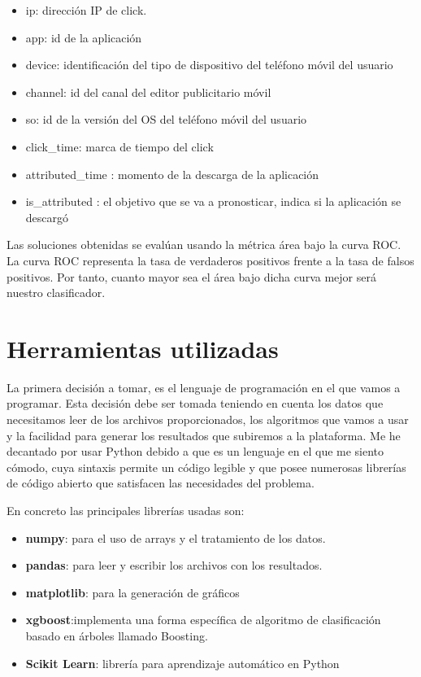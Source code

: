 \begin{itemize}
	
	\item ip: dirección IP de click.
	\item app: id de la aplicación
	\item device: identificación del tipo de dispositivo del teléfono móvil del usuario
	\item channel: id del canal del editor publicitario móvil
	\item so: id de la versión del OS del teléfono móvil del usuario
	\item click\_time: marca de tiempo del click 
	\item attributed\_time : momento de la descarga de la aplicación 
	\item is\_attributed : el objetivo que se va a pronosticar, indica si la aplicación se descargó
\end{itemize}

Las soluciones obtenidas se evalúan usando la métrica área bajo la curva ROC.
\medskip
La curva ROC representa la tasa de verdaderos positivos frente a la tasa de falsos positivos. Por tanto, cuanto mayor sea el área bajo dicha curva mejor será nuestro clasificador.


\section{Herramientas utilizadas}
La primera decisión a tomar, es el lenguaje de programación en el que vamos a programar. Esta decisión debe ser tomada teniendo en cuenta los datos que necesitamos leer de los archivos proporcionados, los algoritmos que vamos a usar y la facilidad para generar los resultados que subiremos a la plataforma. Me he decantado por usar Python debido a que es un lenguaje en el que me siento cómodo, cuya sintaxis permite un código legible y que posee numerosas librerías de código abierto que satisfacen las necesidades del problema.
\medskip

En concreto las principales librerías usadas son:
\begin{itemize}
	\item \textbf{numpy}: para el uso de arrays y el tratamiento de los datos.
	\item \textbf{pandas}: para leer y escribir los archivos con los resultados.
	\item \textbf{matplotlib}: para la generación de gráficos
	\item \textbf{xgboost}:implementa una forma específica de
	algoritmo de clasificación basado en árboles llamado Boosting.
	\item \textbf{Scikit Learn}: librería para aprendizaje automático en Python
\end{itemize}
